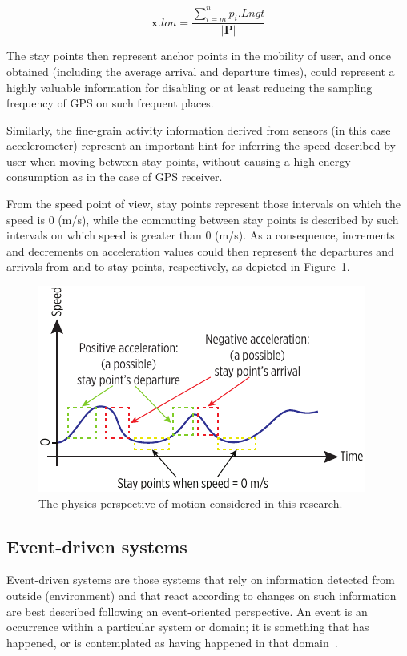 \documentclass[ENG,PhD]{cinvestav}
\begin{document}
\begin{equation}
\mathbf{x}.lon = \frac{ \sum_{i=m}^{n}p_{i}.Lngt }{ |\mathbf{P}| }\label{eq:centroid-longitude}
\end{equation}

The stay points then represent anchor points in the mobility of user, and once obtained (including the average arrival and departure times), could represent a highly valuable information for disabling or at least reducing the sampling frequency of GPS on such frequent places.

Similarly, the fine-grain activity information derived from sensors (in this case accelerometer) represent an important hint for inferring the speed described by user when moving between stay points, without causing a high energy consumption as in the case of GPS receiver.

From the speed point of view, stay points represent those intervals on which the speed is 0 (m/s), while the commuting between stay points is described by such intervals on which speed is greater than 0 (m/s). 
As a consequence, increments and decrements on acceleration values could then represent the departures and arrivals from and to stay points, respectively, as depicted in Figure~\ref{fig:physics-perspective-of-motion}.

\begin{figure}
  \centering
  \includegraphics[]{vectors/physics-perspective-of-motion}
  \caption{The physics perspective of motion considered in this research.}
  \label{fig:physics-perspective-of-motion}
\end{figure}


\subsection{Event-driven systems}
Event-driven systems are those systems that rely on information detected from outside (environment) and that react according to changes on such information are best described following an event-oriented perspective.
An event is an occurrence within a particular system or domain; it is something that has happened, or is contemplated as having happened in that domain~\cite{Etzion2011}.
\end{document}
